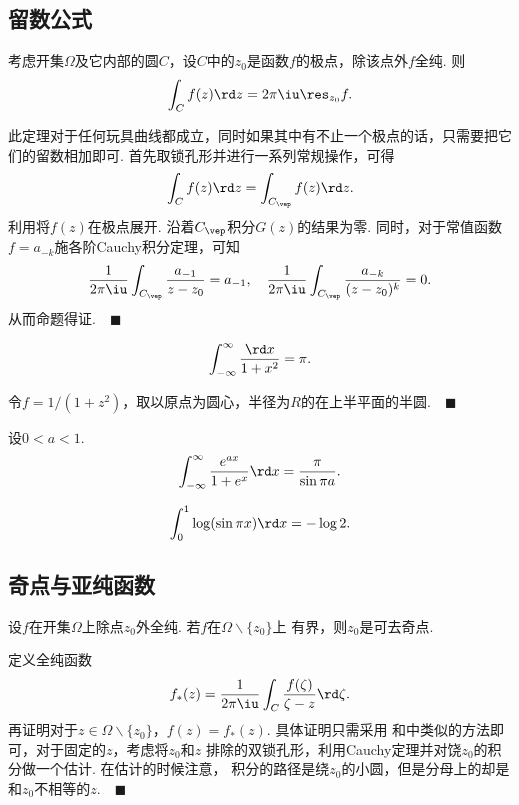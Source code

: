 
\subsection{留数公式}
  \begin{thm}[留数公式]
    考虑开集$\Omega$及它内部的圆$C$，设$C$中的$z_0$是函数$f$的极点，除该点外$f$全纯. 则
    \begin{equation}
      \label{equ: 留数公式}
      \int_C f(z)\rd z = 2\pi\iu\res_{z_0}f.
    \end{equation}
  \end{thm}
  \remark
    此定理对于任何玩具曲线都成立，同时如果其中有不止一个极点的话，只需要把它们的留数相加即可.
  \proof
    首先取锁孔形并进行一系列常规操作，可得
    \[
      \int_{C}f(z)\rd z = \int_{C_\vep} f(z)\rd z.
    \]
    利用将$f(z)$在极点展开. 沿着$C_\vep$积分$G(z)$的结果为零.
    同时，对于常值函数$f=a_{-k}$施各阶Cauchy积分定理，可知
    \[
      \frac{1}{2\pi\iu}\int_{C_\vep}\frac{a_{-1}}{z-z_0}=a_{-1},\quad
      \frac{1}{2\pi\iu}\int_{C_\vep}\frac{a_{-k}}{(z-z_0)^k}=0.
    \]
    从而命题得证.$\quad\blacksquare$

  \begin{pos}
    \[
      \int_{-\infty}^\infty \frac{\rd x}{1+x^2} = \pi.
    \]
  \end{pos}
  \proof
    令$f = 1/(1+z^2)$，取以原点为圆心，半径为$R$的在上半平面的半圆.$\quad\blacksquare$

  \begin{pos}
    设$0<a<1$. 
    \[
      \int_{-\infty}^\infty \frac{e^{ax}}{1+e^x}\rd x = \frac{\pi}{\sin\pi a}.
    \]
  \end{pos}

  \begin{pos}
    \[
      \int_0^1\log(\sin\pi x)\rd x = -\log 2.
    \]
  \end{pos}
  
\subsection{奇点与亚纯函数}

  \begin{thm}[Riemann]
    \label{thm: Riemann、可去奇点}
    设$f$在开集$\Omega$上除点$z_0$外全纯. 若$f$在$\Omega\backslash\{z_0\}$上
    有界，则$z_0$是可去奇点.
  \end{thm}
  \proof
    定义全纯函数
    \[
      f_*(z) = \frac{1}{2\pi\iu}\int_C\frac{f(\zeta)}{\zeta-z}\rd\zeta.
    \]
    再证明对于$z\in\Omega\backslash\{z_0\}$，$f(z)=f_*(z)$. 具体证明只需采用
    和中类似的方法即可，对于固定的$z$，考虑将$z_0$和$z$
    排除的双锁孔形，利用Cauchy定理并对饶$z_0$的积分做一个估计. 在估计的时候注意，
    积分的路径是绕$z_0$的小圆，但是分母上的却是和$z_0$不相等的$z$.$\quad\blacksquare$

